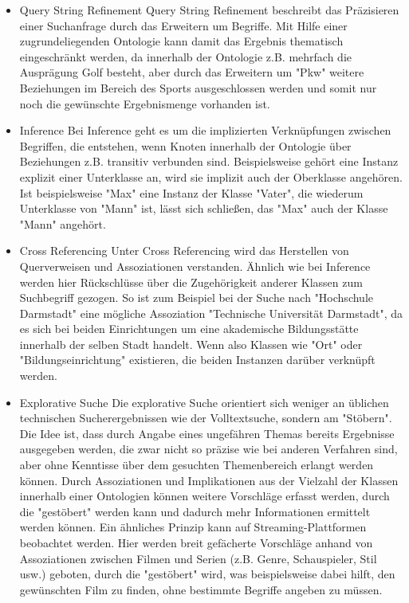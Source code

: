 \begin{itemize}
    \item Query String Refinement\newline
          Query String Refinement beschreibt das Präzisieren einer Suchanfrage durch das Erweitern um Begriffe. Mit Hilfe einer zugrundeliegenden Ontologie kann damit das Ergebnis thematisch eingeschränkt werden, da innerhalb der Ontologie z.B. mehrfach die Ausprägung Golf besteht, aber durch das Erweitern um "Pkw" weitere Beziehungen im Bereich des Sports ausgeschlossen werden und somit nur noch die gewünschte Ergebnismenge vorhanden ist.
    \item Inference\newline
          Bei Inference geht es um die implizierten Verknüpfungen zwischen Begriffen, die entstehen, wenn Knoten innerhalb der Ontologie über Beziehungen z.B. transitiv verbunden sind. Beispielsweise gehört eine Instanz explizit einer Unterklasse an, wird sie implizit auch der Oberklasse angehören. Ist beispielsweise "Max" eine Instanz der Klasse "Vater", die wiederum Unterklasse von "Mann" ist, lässt sich schließen, das "Max" auch der Klasse "Mann" angehört.
    \item Cross Referencing\newline
          Unter Cross Referencing wird das Herstellen von Querverweisen und Assoziationen verstanden. Ähnlich wie bei Inference werden hier Rückschlüsse über die Zugehörigkeit anderer Klassen zum Suchbegriff gezogen. So ist zum Beispiel bei der Suche nach "Hochschule Darmstadt" eine mögliche Assoziation "Technische Universität Darmstadt", da es sich bei beiden Einrichtungen um eine akademische Bildungsstätte innerhalb der selben Stadt handelt. Wenn also Klassen wie "Ort" oder "Bildungseinrichtung" existieren, die beiden Instanzen darüber verknüpft werden.
    \item Explorative Suche\newline
          Die explorative Suche orientiert sich weniger an üblichen technischen Sucherergebnissen wie der Volltextsuche, sondern am "Stöbern". Die Idee ist, dass durch Angabe eines ungefähren Themas bereits Ergebnisse ausgegeben werden, die zwar nicht so präzise wie bei anderen Verfahren sind, aber ohne Kenntisse über dem gesuchten Themenbereich erlangt werden können. Durch Assoziationen und Implikationen aus der Vielzahl der Klassen innerhalb einer Ontologien können weitere Vorschläge erfasst werden, durch die "gestöbert" werden kann und dadurch mehr Informationen ermittelt werden können. Ein ähnliches Prinzip kann auf Streaming-Plattformen beobachtet werden. Hier werden breit gefächerte Vorschläge anhand von Assoziationen zwischen Filmen und Serien (z.B. Genre, Schauspieler, Stil usw.) geboten, durch die "gestöbert" wird, was beispielsweise dabei hilft, den gewünschten Film zu finden, ohne bestimmte Begriffe angeben zu müssen.
          \cite{Sack.2010}
\end{itemize}
